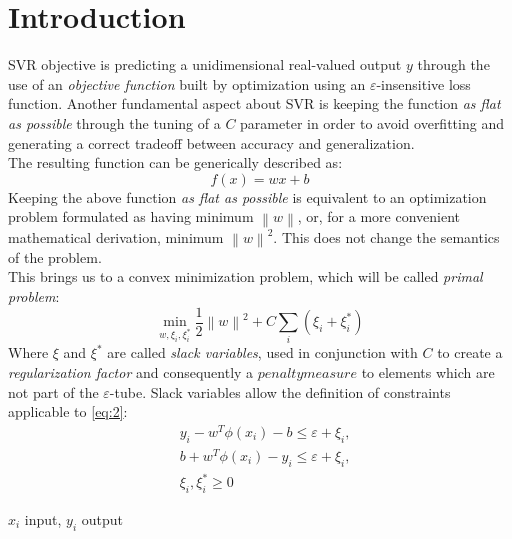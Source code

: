 \documentclass[12pt]{article}
\newcommand{\norm}[1]{\left\lVert#1\right\rVert}
\begin{document}
	\section{Introduction}
	SVR objective is predicting a unidimensional real-valued output $y$ through the use of an \textit{objective function} built by optimization using an $\varepsilon$-insensitive loss function. Another fundamental aspect about SVR is keeping the function \textit{as flat as possible} through the tuning of a $C$ parameter in order to avoid overfitting and generating a correct tradeoff between accuracy and generalization.\\
	The resulting function can be generically described as:
		\begin{equation}\label{eq:1}
			f(x) = w  x + b
		\end{equation}
	Keeping the above function \textit{as flat as possible} is equivalent to an optimization problem formulated as having minimum $\norm{w}$, or, for a more convenient mathematical derivation, minimum $\norm{w}^2$. This does not change the semantics of the problem.\\
	This brings us to a convex minimization problem, which will be called \textit{primal problem}:
\begin{equation}\label{eq:2}
		\min_{w,\xi_i,\xi_i^*} \frac{1}{2}\norm{w}^2+C\sum_{i}(\xi_{i} + \xi_{i}^*)
	\end{equation}
	Where $\xi$ and $\xi^*$ are called \textit{slack variables}, used in conjunction with $C$ to create a \textit{regularization factor} and consequently a $penalty measure$ to elements which are not part of the $\varepsilon$-tube. Slack variables allow the definition of constraints applicable to \eqref{eq:2}:
	\begin{subequations}
	\begin{align}
		&y_i - w^T\phi(x_i) - b \leq \varepsilon + \xi_i,  \label{eq:3a}\\ 
		&b + w^T\phi(x_i) - y_i \leq \varepsilon + \xi_i, \label{eq:3b}\\
		&\xi_i,\xi_i^*  \geq 0 \label{eq:3c}
	\end{align}
	\end{subequations}
	\begin{center}
		\footnotesize{$x_i$ input, $y_i$ output}
	\end{center}
	\pagebreak
\end{document}
